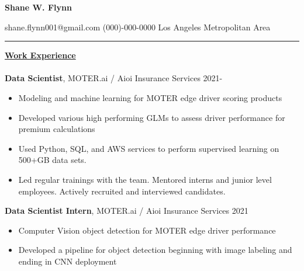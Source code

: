 \documentclass[letterpaper]{article}
\def\name{Shane W. Flynn}
\begin{document}
\centerline{\huge \textbf{\name}}
\vspace{0.1in}
shane.flynn001@gmail.com \hfill (000)-000-0000
\hfill Los Angeles Metropolitan Area
\hrule
\vspace{0.15in}
{\large \textbf{\underline{Work Experience}}}\\
\vspace{-0.2in}\\

\textbf{Data Scientist}, MOTER.ai / Aioi Insurance Services \hfill 2021-
\vspace{-.2in}\\
\begin{itemize}
  \item Modeling and machine learning for MOTER edge driver scoring products
  \vspace{-.1in}
  \item Developed various high performing GLMs to assess driver performance for
  premium calculations
  \vspace{-.1in}
  \item Used Python, SQL, and AWS services to perform supervised learning on
  \vspace{-.1in}
  500+GB data sets.
  \item Led regular trainings with the team. Mentored interns and junior level employees. Actively recruited and interviewed candidates.
\end{itemize}

\textbf{Data Scientist Intern}, MOTER.ai / Aioi Insurance Services \hfill 2021
\vspace{-0.2in}\\
\begin{itemize}
  \item Computer Vision object detection for MOTER edge driver performance
  \vspace{-.1in}
  \item Developed a pipeline for object detection beginning with image labeling and ending in CNN deployment
\end{itemize}
\end{document}
